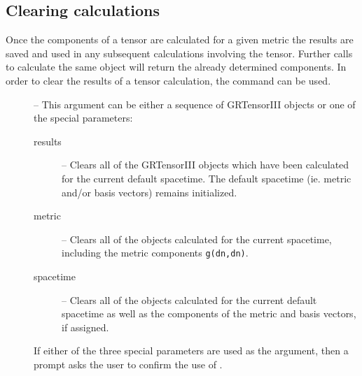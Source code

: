 \documentclass{article}
\begin{document}
\subsection{Clearing calculations} \label{sec:grclear}
%
Once the components of a tensor are calculated for a given metric the
results are saved and used in any subsequent calculations involving
the tensor. Further calls to calculate the same object will return
the already determined components.
In order to clear the results of a tensor calculation, the command
 can be used.\\
%
\begin{cmdspec}
  \label{spec:grclear}

  \begin{description}
    \item[] -- This argument can be either a sequence of
      GRTensorIII objects or one of the special parameters:
      \begin{description}
        \item[results] -- Clears all of the
          GRTensorIII objects which have been calculated for the
          current default spacetime. The default spacetime
          (ie. metric and/or basis vectors) remains initialized.
        \item[metric] -- Clears all of the
          objects calculated for the current spacetime, 
          including the metric components \texttt{g(dn,dn)}.
        \item[spacetime] -- Clears all of the objects
          calculated for the current default spacetime as well as
          the components of the metric and basis vectors, if assigned.
       \end{description}
       If either of the three special parameters are used as the 
        argument, then a prompt asks the user to confirm 
       the use of .
  \end{description}

\end{cmdspec}
\end{document}

